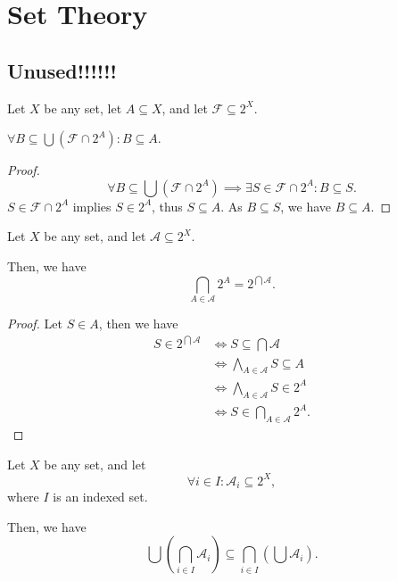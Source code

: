 
\chapter{Set Theory}



\section{Unused!!!!!!}

\begin{lemma}
	\label{lm: subset of the union of a family and powerset}

	Let $X$ be any set, let $A \subseteq X$, and let $\mathcal F \subseteq 2^X$.
	
	$\forall B \subseteq \bigcup( \mathcal F \cap 2^A): B \subseteq A$.
	
	\begin{proof}
		$$
		\forall B \subseteq \bigcup( \mathcal F \cap 2^A) \implies \exists S \in \mathcal F \cap 2^A: B \subseteq S.
		$$
		$S \in \mathcal F \cap 2^A$ implies $S \in 2^A$, thus $S \subseteq A$. As $B \subseteq S$, we have $B \subseteq A$.
	\end{proof}
\end{lemma}


\begin{lemma}
	\label{lm: intersection of power sets}
	
	Let $X$ be any set, and let $\mathcal A \subseteq 2^X$.
	
	Then, we have
	$$
	\bigcap_{A \in \mathcal A} 2^A = 2^{\bigcap \mathcal A}.
	$$
	
	\begin{proof}
		Let $S \in A$, then we have
		$$
		\begin{aligned}
			S \in 2^{\bigcap \mathcal A} &\iff S \subseteq \bigcap \mathcal A \\
			&\iff \bigwedge_{A \in \mathcal A} S \subseteq A \\
			&\iff \bigwedge_{A \in \mathcal A} S \in 2^A \\
			&\iff S \in \bigcap_{A \in \mathcal A} 2^A.
		\end{aligned}
		$$
	\end{proof}
\end{lemma}


\begin{lemma}
	\label{lm: union of intersections of indexed families}
	Let $X$ be any set, and let
	$$
	\forall i \in I: \mathcal A_i \subseteq 2^X,
	$$
	where $I$ is an indexed set.
	
	Then, we have
	$$
	\bigcup \left( \bigcap_{i \in I} \mathcal A_i \right) \subseteq \bigcap_{i \in I} \left( \bigcup \mathcal A_i \right).
	$$
\end{lemma}



